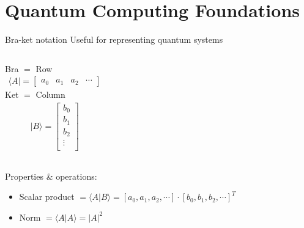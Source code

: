\graphicspath{{assets/foundations/}}

\section[Quantum Computing Foundations]{Quantum Computing Foundations}

\begin{frame}{Bra-ket notation}
    Useful for representing quantum systems
		\begin{columns}[T,onlytextwidth]
			\centering
			Bra $=$ Row
			\begin{align*}
			    \langle A\rvert
			     = 
                \begin{bmatrix}
                a_{0} & a_{1} & a_{2} & \cdots
                \end{bmatrix}
            \end{align*}
			\centering
			Ket $=$ Column
            \begin{align*}
			    \lvert B\rangle
			     = 
                \begin{bmatrix}
                b_{0} \\
                b_{1} \\
                b_{2} \\
                \vdots \\
                \end{bmatrix}
            \end{align*}
		\end{columns}
		Properties \& operations:
		\begin{itemize}
			\item Scalar product $= \langle A\lvert B \rangle = [a_{0}, a_{1}, a_{2}, \cdots] \cdot [b_{0}, b_{1}, b_{2}, \cdots]^T$ 
			\item Norm $= \langle A\lvert A \rangle = |A|^2$
		\end{itemize}
    
\end{frame}

